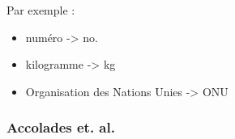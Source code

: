 \documentclass[10pt, french]{article}
\begin{document}
\begin{multicols*}{2}
\begin{definitionNOHFILLprop}
\begin{astuces}
Par exemple : 
\begin{itemize}
	\item	numéro -> no.
	\item	kilogramme -> kg
	\item	Organisation des Nations Unies -> ONU
\end{itemize}
\end{astuces}
\end{definitionNOHFILLprop}

\begin{definitionNOHFILL}[La virgule]

\end{definitionNOHFILL}

\begin{definitionNOHFILLprop}

\end{definitionNOHFILLprop}

\begin{definitionNOHFILLprop}

\end{definitionNOHFILLprop}

\subsubsection{Accolades et. al.}

\begin{definitionNOHFILLprop}

\end{definitionNOHFILLprop}

\begin{definitionNOHFILLprop}

\end{definitionNOHFILLprop}

\begin{definitionNOHFILLprop}

\end{definitionNOHFILLprop}

\begin{definitionNOHFILLprop}[Le tiret]

\end{definitionNOHFILLprop}

\begin{definitionNOHFILLprop}

\end{definitionNOHFILLprop}


\end{multicols*}
\end{document}
